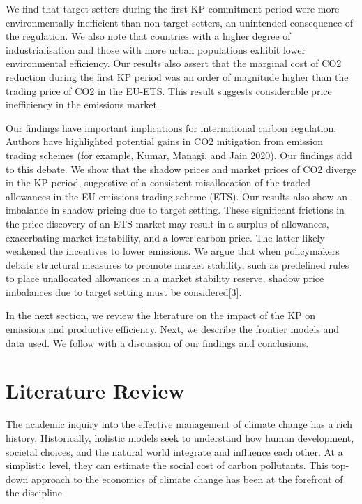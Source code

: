 \documentclass[
]{article}\usepackage{amsmath,amssymb}
\begin{document}
We find that target setters during the first KP commitment period were
more environmentally inefficient than non-target setters, an unintended
consequence of the regulation. We also note that countries with a higher
degree of industrialisation and those with more urban populations
exhibit lower environmental efficiency. Our results also assert that the
marginal cost of CO2 reduction during the first KP period was an order
of magnitude higher than the trading price of CO2 in the EU-ETS. This
result suggests considerable price inefficiency in the emissions market.

Our findings have important implications for international carbon
regulation. Authors have highlighted potential gains in CO2 mitigation
from emission trading schemes (for example, Kumar, Managi, and Jain
2020). Our findings add to this debate. We show that the shadow prices
and market prices of CO2 diverge in the KP period, suggestive of a
consistent misallocation of the traded allowances in the EU emissions
trading scheme (ETS). Our results also show an imbalance in shadow
pricing due to target setting. These significant frictions in the price
discovery of an ETS market may result in a surplus of allowances,
exacerbating market instability, and a lower carbon price. The latter
likely weakened the incentives to lower emissions. We argue that when
policymakers debate structural measures to promote market stability,
such as predefined rules to place unallocated allowances in a market
stability reserve, shadow price imbalances due to target setting must be
considered{[}3{]}.

In the next section, we review the literature on the impact of the KP on
emissions and productive efficiency. Next, we describe the frontier
models and data used. We follow with a discussion of our findings and
conclusions.

\hypertarget{literature-review}{%
\section{Literature Review}\label{literature-review}}

The academic inquiry into the effective management of climate change has
a rich history. Historically, holistic models seek to understand how
human development, societal choices, and the natural world integrate and
influence each other. At a simplistic level, they can estimate the
social cost of carbon pollutants. This top-down approach to the
economics of climate change has been at the forefront of the discipline
\end{document}

